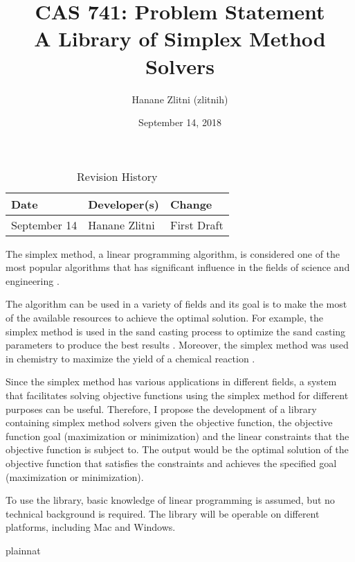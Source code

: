 \documentclass{article}
\title{CAS 741: Problem Statement\\A Library of Simplex Method Solvers}
\author{Hanane Zlitni (zlitnih)}
\date{September 14, 2018}
\begin{document}
\maketitle

\begin{table}[hp]
\caption{Revision History} \label{TblRevisionHistory}
\begin{tabularx}{\textwidth}{llX}
\toprule
\textbf{Date} & \textbf{Developer(s)} & \textbf{Change}\\
\midrule
September 14 & Hanane Zlitni & First Draft\\
\bottomrule
\end{tabularx}
\end{table}

The simplex method, a linear programming algorithm, is considered one of the most popular algorithms that has significant influence in the fields of science and engineering \cite{simplex-popularity}. \par 

The algorithm can be used in a variety of fields and its goal is to make the most of the available resources to achieve the optimal solution. For example, the simplex method is used in the sand casting process to optimize the sand casting parameters to produce the best results \cite{sand-casting}. Moreover, the simplex method was used in chemistry to maximize the yield of a chemical reaction \cite{chemistry}. \par

Since the simplex method has various applications in different fields, a system that facilitates solving objective functions using the simplex method for different purposes can be useful. Therefore, I propose the development of a library containing simplex method solvers given the objective function, the objective function goal (maximization or minimization) and the linear constraints that the objective function is subject to. The output would be the optimal solution of the objective function that satisfies the constraints and achieves the specified goal (maximization or minimization). \par 

To use the library, basic knowledge of linear programming is assumed, but no technical background is required. The library will be operable on different platforms, including Mac and Windows.

 {plainnat}

\end{document}
